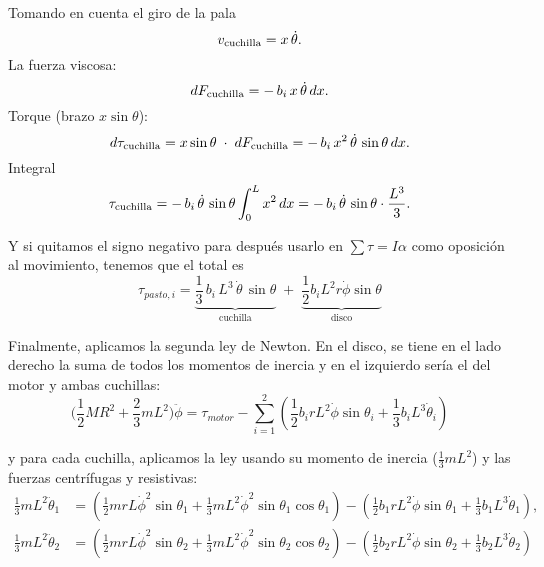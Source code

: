 \documentclass[stu,12pt,floatsintext,draftfirst,spanish]{report}
\begin{document}
	
	Tomando en cuenta el giro de la pala 
	\begin{equation}
	v_{\rm cuchilla} = x\,\dot\theta.
	\end{equation}
	La fuerza viscosa: 
	\begin{equation}
	dF_{\rm cuchilla} = -\,b_i\,x\,\dot\theta\,dx.
	\end{equation}
	Torque (brazo $x\sin\theta$):  
	\begin{equation}
	d\tau_{\rm cuchilla}
	= x\sin\theta\;\cdot\; dF_{\rm cuchilla}
	= -\,b_i\,x^2\,\dot\theta\,\sin\theta\,dx.
	\end{equation}
	Integral  
	\begin{equation}
	\tau_{\rm cuchilla}
	= -\,b_i\,\dot\theta\,\sin\theta
	\int_0^L x^2\,dx
	= -\,b_i\,\dot\theta\,\sin\theta
	\cdot \frac{L^3}{3}.
	\end{equation}
	

	Y si quitamos el signo negativo para después usarlo en \(\sum\tau=I\alpha\) como oposición al movimiento, tenemos que el total es
	\begin{equation}
	\tau_{pasto,i}
	= 
	\underbrace{\frac{1}{3}\,b_i\,L^3\,\dot\theta\,\sin\theta}_{\displaystyle\text{cuchilla}}
	\;+\;
	\underbrace{\frac12b_iL^2r\dot\phi\sin\theta}_{\displaystyle\text{disco}}
	\end{equation}

	
	Finalmente, aplicamos la segunda ley de Newton. En el disco, se tiene en el lado derecho la suma de todos los momentos de inercia y en el izquierdo sería el del motor y ambas cuchillas:
	\begin{equation} \boxed{\Big(\frac{1}{2} M R^2+\frac23mL^2\Big) \ddot{\phi} = \tau_{motor} - \sum_{i=1}^{2}\left( \frac{1}{2} b_i r L^2 \dot{\phi} \sin\theta_i + \frac{1}{3} b_i L^3 \dot{\theta}_i \right)} \end{equation}
	
	y para cada cuchilla, aplicamos la ley usando su momento de inercia ($\frac{1}{3} m L^2$) y las fuerzas centrífugas y resistivas:
	\begin{equation}
	\boxed{
	\begin{aligned}
		\frac{1}{3} m L^2 \ddot{\theta}_1 &= \left( \frac{1}{2} m r L \dot{\phi}^2 \sin\theta_1 + \frac{1}{3} m L^2 \dot{\phi}^2 \sin\theta_1 \cos\theta_1 \right) - \left( \frac{1}{2} b_1 r L^2 \dot{\phi} \sin\theta_1 + \frac{1}{3} b_1 L^3 \dot{\theta}_1 \right), \\
		\frac{1}{3} m L^2 \ddot{\theta}_2 &= \left( \frac{1}{2} m r L \dot{\phi}^2 \sin\theta_2 + \frac{1}{3} m L^2 \dot{\phi}^2 \sin\theta_2 \cos\theta_2 \right) - \left( \frac{1}{2} b_2 r L^2 \dot{\phi} \sin\theta_2 + \frac{1}{3} b_2 L^3 \dot{\theta}_2 \right)
	\end{aligned}}
	\end{equation}
	
\end{document}
